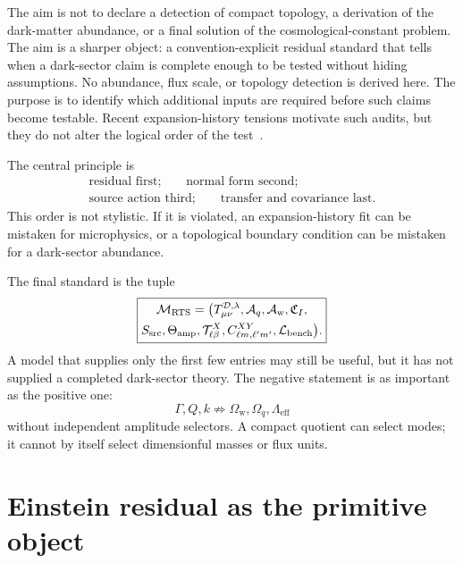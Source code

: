 \documentclass[
  aps,
  prd,
  reprint,
  superscriptaddress,
  floatfix,
  nofootinbib,
  longbibliography
]{revtex4-2}
\theoremstyle{plain}
\theoremstyle{definition}
\theoremstyle{remark}
\newcommand{\D}{\mathcal D}
\newcommand{\eff}{\mathrm{eff}}
\newcommand{\wind}{\mathrm w}
\newcommand{\Aq}{\mathcal A_q}
\newcommand{\Aw}{\mathcal A_{\mathrm w}}
\newcommand{\Tcal}{\mathcal T}
\newcommand{\Mcal}{\mathcal M}
\newcommand{\Lcal}{\mathcal L}
\begin{document}
The aim is not to declare a detection of compact topology, a derivation of the dark-matter abundance, or a final solution of the cosmological-constant problem.  The aim is a sharper object: a convention-explicit residual standard that tells when a dark-sector claim is complete enough to be tested without hiding assumptions.  No abundance, flux scale, or topology detection is derived here.  The purpose is to identify which additional inputs are required before such claims become testable.  Recent expansion-history tensions motivate such audits, but they do not alter the logical order of the test~\cite{DESI2025DR2}.

The central principle is
\begin{equation}
\boxed{\begin{gathered}
\text{residual first;}\qquad
\text{normal form second;}\\
\text{source action third;}\qquad
\text{transfer and covariance last.}
\end{gathered}}
\label{eq:principle}
\end{equation}
This order is not stylistic.  If it is violated, an expansion-history fit can be mistaken for microphysics, or a topological boundary condition can be mistaken for a dark-sector abundance.

The final standard is the tuple
\begin{equation}
\boxed{\begin{gathered}
\Mcal_{\rm RTS}=\bigl(T^{\D,\lambda}_{\mu\nu},\Aq,\Aw,\mathfrak C_I,\\
S_{\rm src},\Theta_{\rm amp},\Tcal^X_{\ell\beta},
C^{XY}_{\ell m,\ell'm'},\Lcal_{\rm bench}\bigr).
\end{gathered}}
\label{eq:RTS_tuple}
\end{equation}
A model that supplies only the first few entries may still be useful, but it has not supplied a completed dark-sector theory.  The negative statement is as important as the positive one:
\begin{equation}
\boxed{
\Gamma,Q,k\not\Rightarrow \Omega_{\wind},\Omega_q,\Lambda_{\eff}
}
\label{eq:not_amplitudes}
\end{equation}
without independent amplitude selectors.  A compact quotient can select modes; it cannot by itself select dimensionful masses or flux units.

\section{Einstein residual as the primitive object}
\end{document}
